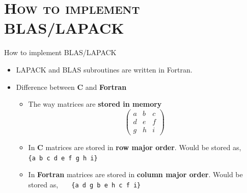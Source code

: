 \documentclass[xcolor=x11names,compress]{beamer}
\newcommand\Fontvi{\fontsize{6}{7.2}\selectfont}
\renewcommand{\(}{\begin{columns}}
\renewcommand{\)}{\end{columns}}
\newcommand{\<}[1]{\begin{column}{#1}}
\renewcommand{\>}{\end{column}}
\begin{document}
\section{\scshape How to implement BLAS/LAPACK}
\begin{frame}[fragile]{How to implement BLAS/LAPACK}
\begin{scriptsize}\begin{itemize} 
 \item LAPACK and BLAS subroutines are written in Fortran.
 \item Difference between \textbf{C} and \textbf{Fortran}
\begin{itemize}
  \item The way matrices are \textbf{stored in memory}%
\[\left( \begin{array}{ccc}
a & b & c \\
d & e & f \\
g & h & i \end{array} \right)\] 
  \item In \textbf{C} matrices are stored in \textbf{row major order}. Would be stored as, \verb+   {a b c d e f g h i}+ 
  \item In \textbf{Fortran} matrices are stored in\textbf{ column major order}. Would be stored as, \verb+   {a d g b e h c f i}+
\end{itemize}
\end{itemize}\end{scriptsize}

\end{frame}
\end{document}
